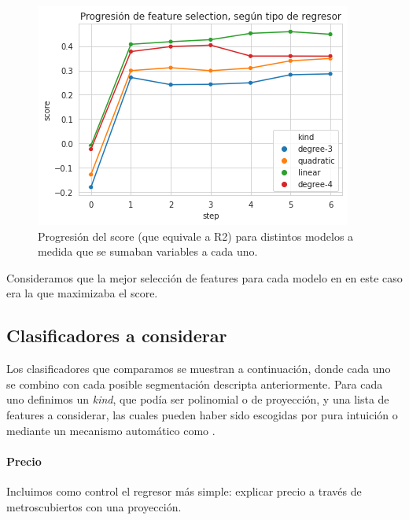     \begin{figure}[H]
        \centering
        \includegraphics[scale=0.6]{img/cmp/1_fss.png}
        \caption{Progresión del score (que equivale a R2) para distintos modelos a medida que se sumaban variables a cada uno.}
        \label{fss}
    \end{figure}
    Consideramos que la mejor selección de features para cada modelo en en este caso era la que maximizaba el score.
    
    \subsection{Clasificadores a considerar}
    
    Los clasificadores que comparamos se muestran a continuación, donde cada uno se combino con cada posible segmentación descripta anteriormente. Para cada uno definimos un \textit{kind}, que podía ser polinomial o de proyección, y una lista de features a considerar, las cuales pueden haber sido escogidas por pura intuición o mediante un mecanismo automático como \fss.
    
    \paragraph{Precio}\mbox{}\vspace{1em}
    
    Incluimos como control el regresor más simple: explicar precio a través de metroscubiertos con una proyección.
    
